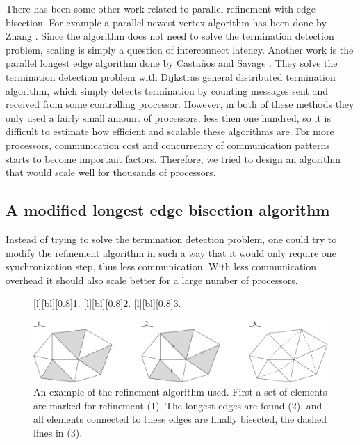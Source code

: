 There has been some other work related to parallel refinement with
edge bisection. For example a parallel newest vertex algorithm has
been done by Zhang \cite{Zhang2005}. Since the algorithm does not need
to solve the termination detection problem, scaling is simply a
question of interconnect latency. Another work is the parallel longest
edge algorithm done by Casta\~nos and Savage \cite{CastanosSavage1999}. They
solve the termination detection problem with Dijkstras general
distributed termination algorithm, which simply detects termination by
counting messages sent and received from some controlling
processor. However, in both of these methods they only used a fairly
small amount of processors, less then one hundred, so it is difficult
to estimate how efficient and scalable these algorithms are. For more
processors, communication cost and concurrency of communication
patterns starts to become important factors. Therefore, we tried to
design an algorithm that would scale well for thousands of processors.



\subsection{A modified longest edge bisection algorithm}
\label{hoffman-4:sect:modlong}

Instead of trying to solve the termination detection problem, one
could try to modify the refinement algorithm in such a way that it
would only require one synchronization step, thus less
communication. With less communication overhead it should also scale
better for a large number of processors.

\begin{figure}[htb]
 [l][bl][0.8]{1.}  [l][bl][0.8]{2.}
 [l][bl][0.8]{3.}  \begin{center}
 \includegraphics[width=1.0\columnwidth]{chapters/hoffman-4/pdf/mref.pdf}
 \end{center} \caption{An example of the refinement algorithm
 used. First a set of elements are marked for refinement (1). The
 longest edges are found (2), and all elements connected to these
 edges are finally bisected, the dashed lines in (3).}
 \label{hoffman-4:fig:bisectexample}
\end{figure}

